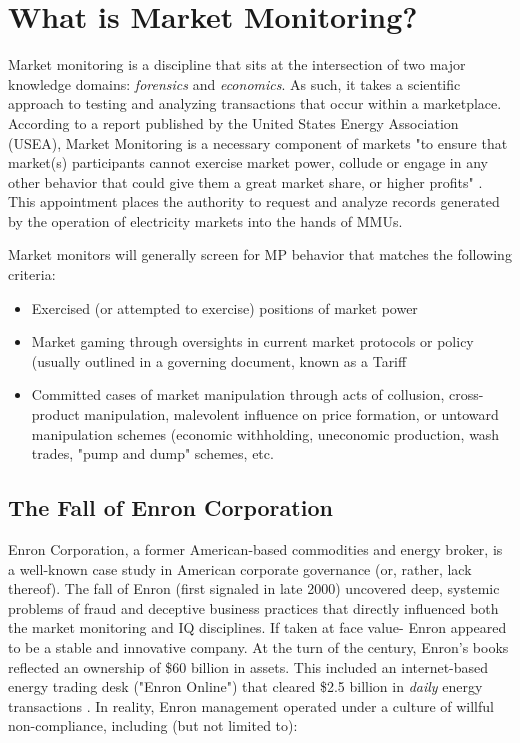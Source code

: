 \section{What is Market Monitoring?}

Market monitoring is a discipline that sits at the intersection of two major knowledge domains: \textit{forensics} and \textit{economics}. As such, it takes a scientific approach to testing and analyzing transactions that occur within a marketplace. According to a report published by the United States Energy Association (USEA), Market Monitoring is a necessary component of markets "to ensure that market(s) participants cannot exercise market power, collude or engage in any other behavior that could give them a great market share, or higher profits" \cite{imm-usea}. This appointment places the authority to request and analyze records generated by the operation of electricity markets into the hands of MMUs.

Market monitors will generally screen for MP behavior that matches the following criteria:

\begin{itemize}
    \item{Exercised (or attempted to exercise) positions of market power}
    \item{Market gaming through oversights in current market protocols or policy (usually outlined in a governing document, known as a Tariff}
    \item{Committed cases of market manipulation through acts of collusion, cross-product manipulation, malevolent influence on price formation, or untoward manipulation schemes (economic withholding, uneconomic production, wash trades, "pump and dump" schemes, etc.}
\end{itemize}


\subsection{The Fall of Enron Corporation}

Enron Corporation, a former American-based commodities and energy broker, is a well-known case study in American corporate governance (or, rather, lack thereof). The fall of Enron (first signaled in late 2000) uncovered deep, systemic problems of fraud and deceptive business practices that directly influenced both the market monitoring and IQ disciplines. If taken at face value- Enron appeared to be a stable and innovative company. At the turn of the century, Enron's books reflected an ownership of \$60 billion in assets. This included an internet-based energy trading desk ("Enron Online") that cleared \$2.5 billion in \textit{daily} energy transactions \cite{enron-financials}. In reality, Enron management operated under a culture of willful non-compliance, including (but not limited to):

